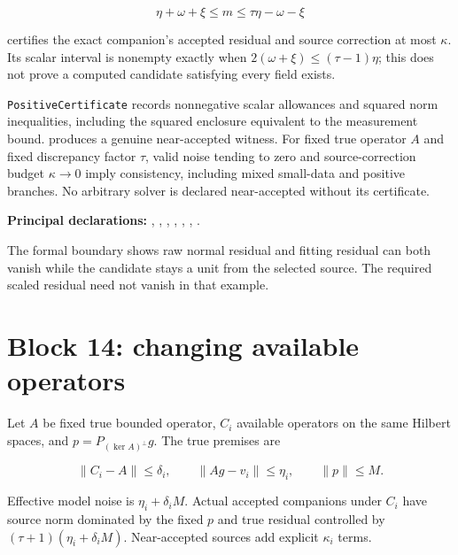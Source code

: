 \documentclass[11pt]{article}
\begin{document}
\[
\eta+\omega+\xi\le m\le\tau\eta-\omega-\xi
\]

certifies the exact companion's accepted residual and source correction
at most \(\kappa\). Its scalar interval is nonempty exactly when
\(2(\omega+\xi)\le(\tau-1)\eta\); this does not prove a computed
candidate satisfying every field exists.

\texttt{PositiveCertificate} records nonnegative scalar
allowances and squared norm inequalities, including the squared
enclosure equivalent to the measurement bound.
\texttt{} produces a genuine
near-accepted witness. For fixed true operator \(A\) and fixed
discrepancy factor \(\tau\), valid noise tending to zero and
source-correction budget \(\kappa\to0\) imply consistency, including
mixed small-data and positive branches. No arbitrary solver is declared
near-accepted without its certificate.

\textbf{Principal declarations:}
\texttt{},
\texttt{},
\texttt{},
\texttt{},
\texttt{},
\texttt{},
\texttt{}.

The formal boundary shows raw normal residual and fitting residual can
both vanish while the candidate stays a unit from the selected source.
The required scaled residual need not vanish in that example.

\hypertarget{block-14-changing-available-operators}{%
\section{Block 14: changing available
operators}\label{block-14-changing-available-operators}}

Let \(A\) be fixed true bounded operator, \(C_i\) available operators on
the same Hilbert spaces, and \(p=P_{(\ker A)^\perp}g\). The true
premises are

\[
\|C_i-A\|\le\delta_i,\qquad
\|Ag-v_i\|\le\eta_i,\qquad \|p\|\le M.
\]

Effective model noise is \(\eta_i+\delta_iM\). Actual accepted
companions under \(C_i\) have source norm dominated by the fixed \(p\)
and true residual controlled by \((\tau+1)(\eta_i+\delta_iM)\).
Near-accepted sources add explicit \(\kappa_i\) terms.
\end{document}
